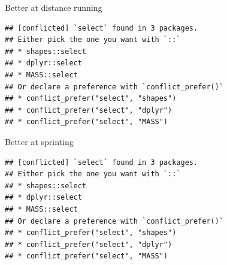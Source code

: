 \documentclass[ignorenonframetext,]{beamer}
\newenvironment{Shaded}{\begin{snugshade}}{\end{snugshade}}
\newcommand{\DataTypeTok}[1]{\textcolor[rgb]{0.13,0.29,0.53}{#1}}
\newcommand{\DecValTok}[1]{\textcolor[rgb]{0.00,0.00,0.81}{#1}}
\newcommand{\FloatTok}[1]{\textcolor[rgb]{0.00,0.00,0.81}{#1}}
\newcommand{\KeywordTok}[1]{\textcolor[rgb]{0.13,0.29,0.53}{\textbf{#1}}}
\newcommand{\NormalTok}[1]{#1}
\newcommand{\OperatorTok}[1]{\textcolor[rgb]{0.81,0.36,0.00}{\textbf{#1}}}
\newcommand{\StringTok}[1]{\textcolor[rgb]{0.31,0.60,0.02}{#1}}
\begin{document}
\begin{frame}[fragile]{Better at distance running}
\protect\hypertarget{better-at-distance-running}{}

\begin{Shaded}
\end{Shaded}

\begin{verbatim}
## [conflicted] `select` found in 3 packages.
## Either pick the one you want with `::` 
## * shapes::select
## * dplyr::select
## * MASS::select
## Or declare a preference with `conflict_prefer()`
## * conflict_prefer("select", "shapes")
## * conflict_prefer("select", "dplyr")
## * conflict_prefer("select", "MASS")
\end{verbatim}

\end{frame}

\begin{frame}[fragile]{Better at sprinting}
\protect\hypertarget{better-at-sprinting}{}

\begin{Shaded}
\end{Shaded}

\begin{verbatim}
## [conflicted] `select` found in 3 packages.
## Either pick the one you want with `::` 
## * shapes::select
## * dplyr::select
## * MASS::select
## Or declare a preference with `conflict_prefer()`
## * conflict_prefer("select", "shapes")
## * conflict_prefer("select", "dplyr")
## * conflict_prefer("select", "MASS")
\end{verbatim}

\end{frame}
\end{document}
